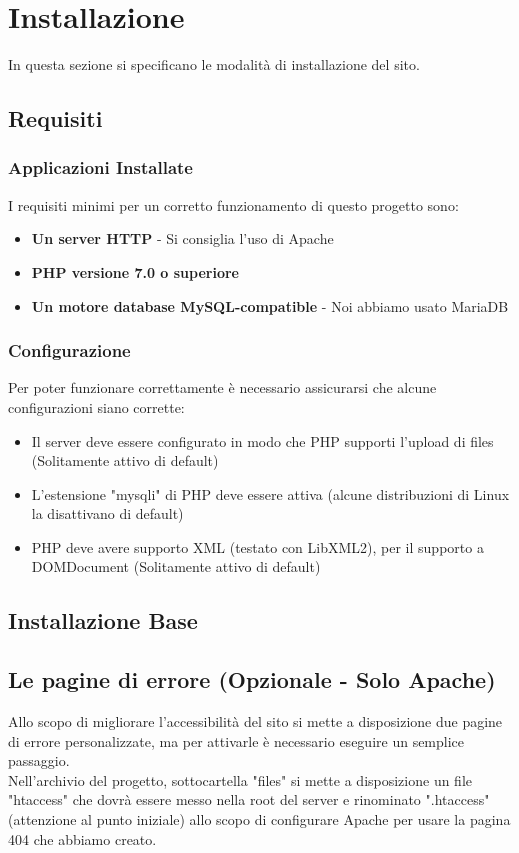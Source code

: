 \section{Installazione}
In questa sezione si specificano le modalità di installazione del sito.

\subsection{Requisiti}
\subsubsection{Applicazioni Installate}
I requisiti minimi per un corretto funzionamento di questo progetto sono:
\begin{itemize}
\item \textbf{Un server HTTP} - Si consiglia l'uso di Apache
\item \textbf{PHP versione 7.0 o superiore}
\item \textbf{Un motore database MySQL-compatible} - Noi abbiamo usato MariaDB
\end{itemize}
\subsubsection{Configurazione}
Per poter funzionare correttamente è necessario assicurarsi che alcune configurazioni siano corrette:
\begin{itemize}
\item Il server deve essere configurato in modo che PHP supporti l'upload di files (Solitamente attivo di default)
\item L'estensione "mysqli" di PHP deve essere attiva (alcune distribuzioni di Linux la disattivano di default)
\item PHP deve avere supporto XML (testato con LibXML2), per il supporto a DOMDocument (Solitamente attivo di default)
\end{itemize}

\subsection{Installazione Base}

\subsection{Le pagine di errore (Opzionale - Solo Apache)}
Allo scopo di migliorare l'accessibilità del sito si mette a disposizione due pagine di errore personalizzate, ma per attivarle è necessario eseguire un semplice passaggio.\\
Nell'archivio del progetto, sottocartella "files" si mette a disposizione un file "htaccess" che dovrà essere messo nella root del server e rinominato ".htaccess" (attenzione al punto iniziale) allo scopo di configurare Apache per usare la pagina 404 che abbiamo creato.
